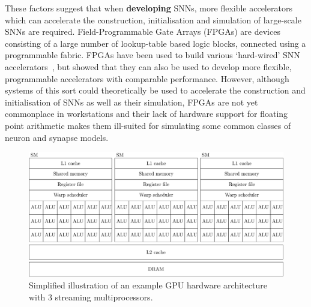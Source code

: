 \documentclass[utf8]{frontiersSCNS} %
\begin{document}
These factors suggest that when \textbf{developing} SNNs, more flexible accelerators which can accelerate the construction, initialisation and simulation of large-scale SNNs are required.
Field-Programmable Gate Arrays (FPGAs) are devices consisting of a large number of lookup-table based logic blocks, connected using a programmable fabric.
FPGAs have been used to build various `hard-wired' SNN accelerators~\citep{Moore2012,Wang2018}, but \citet{Naylor2013} showed that they can also be used to develop more flexible, programmable accelerators with comparable performance.
However, although systems of this sort could theoretically be used to accelerate the construction and initialisation of SNNs as well as their simulation, FPGAs are not yet commonplace in workstations and their lack of hardware support for floating point arithmetic makes them ill-suited for simulating some common classes of neuron and synapse models. 

\begin{figure}
    \begin{center}
        \includegraphics{figures/gpu}
    \end{center}
    \caption{Simplified illustration of an example GPU hardware architecture with 3 streaming multiprocessors.}
    \label{fig:gpu}
\end{figure}
\end{document}
